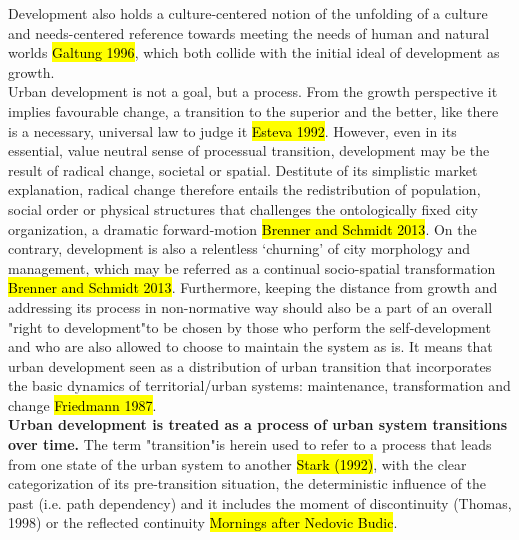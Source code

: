 \documentclass[11pt]{report}
\begin{document}
Development also holds a culture-centered notion of the unfolding of a culture and needs-centered reference towards meeting the needs of human and natural worlds \hl{Galtung 1996}, which both collide with the initial ideal of development as growth.
\\
Urban development is not a goal, but a process.
From the growth perspective it implies favourable change, a transition to the superior and the better, like there is a necessary, universal law to judge it \hl{Esteva 1992}.
However, even in its essential, value neutral sense of processual transition, development may be the result of radical change, societal or spatial.
Destitute of its simplistic market explanation, radical change therefore entails the redistribution of population, social order or physical structures that challenges the ontologically fixed city organization, a dramatic forward-motion \hl{Brenner and Schmidt 2013}.
On the contrary, development is also a relentless ‘churning’ of city morphology and management, which may be referred as a continual socio-spatial transformation \hl{Brenner and Schmidt 2013}.
Furthermore, keeping the distance from growth and addressing its process in non-normative way should also be a part of an overall "right to development"\footnotemark to be chosen by those who perform the self-development and who are also allowed to choose to maintain the system as is.
It means that urban development seen as a distribution of urban transition that incorporates the basic dynamics of territorial/urban systems: maintenance, transformation and change \hl{Friedmann 1987}.
\\
\textbf{Urban development is treated as a process of urban system transitions over time.}
The term "transition"\footnotemark is herein used to refer to a process that leads from one state of the urban system to another \hl{Stark (1992)}, with the clear categorization of its pre-transition situation, the deterministic influence of the past (i.e. path dependency) and it includes the moment of discontinuity (Thomas, 1998) or the reflected continuity \hl{Mornings after Nedovic Budic}.
\end{document}
